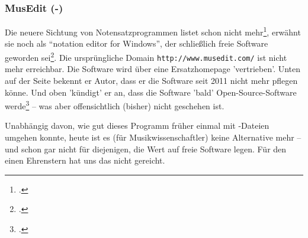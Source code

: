 %
%
%




\subsubsection{MusEdit (-)}

\label{MusEdit}Die neuere Sichtung von Notensatzprogrammen listet 
schon nicht mehr\footcite[vgl.][\nopage wp]{WpedNotensatz2019a}, 
erwähnt sie noch als \enquote{notation editor for Windows}, der schließlich
freie Software geworden sei\footcite[vgl.][\nopage wp]{MusicXML2018b}. Die
ursprüngliche Domain \texttt{http://www.musedit.com/} ist nicht mehr erreichbar.
Die Software wird über eine Ersatzhomepage 'vertrieben'. Unten auf der Seite
bekennt er Autor, dass er die Software seit 2011 nicht mehr pflegen könne. Und
oben 'kündigt' er an, dass die Software 'bald' Open-Source-Software
werde\footcite[vgl.][\nopage wp]{Rogers2011a} -- was aber offensichtlich
(bisher) nicht geschehen ist.

Unabhängig davon, wie gut dieses Programm früher einmal mit
-Dateien umgehen konnte, heute ist es (für Musikwissenschaftler)
keine Alternative mehr -- und schon gar nicht für diejenigen, die Wert auf freie
Software legen. Für den einen Ehrenstern hat uns das nicht gereicht.

%
